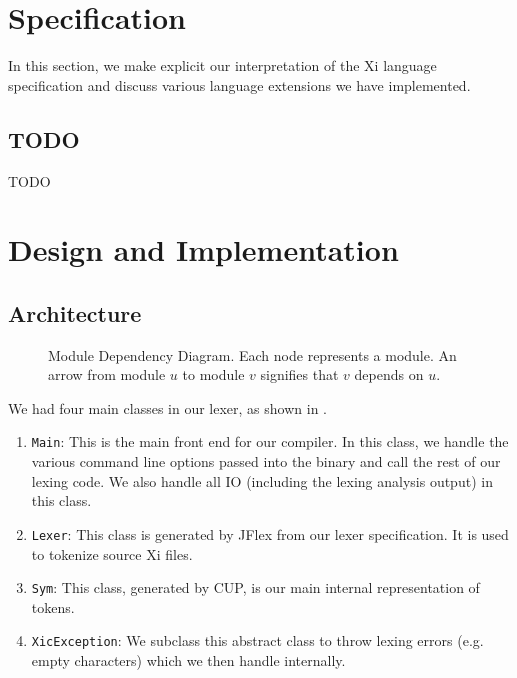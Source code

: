 \documentclass{hw}
\begin{document}
\section{Specification}\label{sec:specification}
In this section, we make explicit our interpretation of the Xi language
specification and discuss various language extensions we have implemented.

\subsection{TODO}
TODO

\section{Design and Implementation}\label{sec:design}
\subsection{Architecture}
\begin{figure}[h]
  \centering
  \caption{%
    Module Dependency Diagram. Each node represents a module. An arrow from
    module $u$ to module $v$ signifies that $v$ depends on $u$.
  }
  \label{fig:mdd}
\end{figure}

We had four main classes in our lexer, as shown in .
\begin{enumerate}
  \item{\texttt{Main}:}
    This is the main front end for our compiler. In this class, we handle the
    various command line options passed into the binary and call the rest of
    our lexing code. We also handle all IO (including the lexing analysis
    output) in this class.

  \item{\texttt{Lexer}:}
    This class is generated by JFlex from our lexer specification.  It is used
    to tokenize source Xi files.

  \item{\texttt{Sym}:}
    This class, generated by CUP, is our main internal representation of
    tokens.

  \item{\texttt{XicException}:}
    We subclass this abstract class to throw lexing errors (e.g.  empty
    characters) which we then handle internally.
\end{enumerate}
\end{document}
